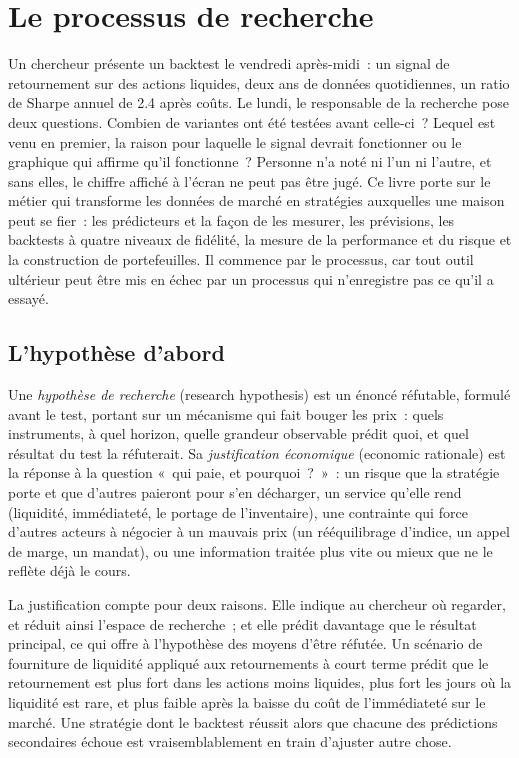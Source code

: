 \chapter{Le processus de recherche}\label{ch:rs:the-research-process}

Un chercheur présente un backtest le vendredi après-midi~: un signal de retournement sur des actions liquides, deux ans de données quotidiennes, un
ratio de Sharpe annuel de 2.4 après coûts. Le lundi, le responsable de la recherche pose deux questions. Combien de variantes ont été testées avant
celle-ci~? Lequel est venu en premier, la raison pour laquelle le signal devrait fonctionner ou le graphique qui affirme qu'il fonctionne~? Personne n'a noté ni l'un ni l'autre, et
sans elles, le chiffre affiché à l'écran ne peut pas être jugé. Ce livre porte sur le métier qui transforme les données de marché en stratégies auxquelles une
maison peut se fier~: les prédicteurs et la façon de les mesurer, les prévisions, les backtests à quatre niveaux de fidélité, la mesure de la performance et du risque
et la construction de portefeuilles. Il commence par le processus, car tout outil ultérieur peut être mis en échec par un
processus qui n'enregistre pas ce qu'il a essayé.

\section{L'hypothèse d'abord}

\begin{definition}\label{def:rs:the-research-process:hypothesis}
Une \emph{hypothèse de recherche} (research hypothesis) est un énoncé réfutable, formulé avant le test, portant sur un
mécanisme qui fait bouger les prix~: quels instruments, à quel horizon, quelle grandeur observable prédit quoi, et quel résultat du
test la réfuterait. Sa \emph{justification économique} (economic rationale) est la réponse à la question «~qui paie,
et pourquoi~?~»~: un risque que la stratégie porte et que d'autres paieront pour s'en décharger, un service qu'elle rend (liquidité, immédiateté, le
portage de l'inventaire), une contrainte qui force d'autres acteurs à négocier à un mauvais prix (un rééquilibrage d'indice, un appel de marge, un
mandat), ou une information traitée plus vite ou mieux que ne le reflète déjà le cours.
\end{definition}

La justification compte pour deux raisons. Elle indique au chercheur où regarder, et réduit ainsi l'espace de recherche~; et elle prédit
davantage que le résultat principal, ce qui offre à l'hypothèse des moyens d'être réfutée. Un scénario de fourniture de liquidité appliqué aux retournements
à court terme prédit que le retournement est plus fort dans les actions moins liquides, plus fort les jours où la liquidité est rare, et
plus faible après la baisse du coût de l'immédiateté sur le marché. Une stratégie dont le backtest réussit alors que chacune des prédictions secondaires échoue est
vraisemblablement en train d'ajuster autre chose.

